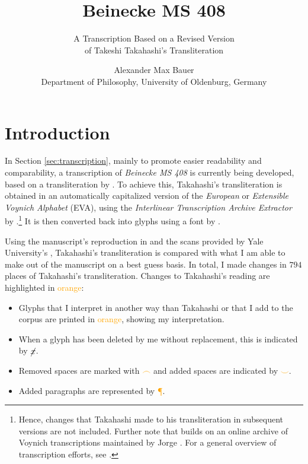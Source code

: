 \documentclass{scrarticle}
\title{Beinecke MS 408}
\subtitle{A Transcription Based on a Revised Version\\of Takeshi Takahashi's Transliteration}
\author{Alexander Max Bauer\\\small{Department of Philosophy, University of Oldenburg, Germany}}
\date{}
\begin{document}
\maketitle
\vfill
\noindent{}
\vfill


\clearpage
\tableofcontents


\clearpage
\section{Introduction}\label{sec:introduction}
In Section \ref{sec:transcription}, mainly to promote easier readability and comparability, a transcription of \textit{Beinecke MS 408} is currently being developed, based on a transliteration by \citet{takahashi_voynich_2004}.
To achieve this, Takahashi's transliteration is obtained in an automatically capitalized version of the \textit{European} or \textit{Extensible Voynich Alphabet} (EVA), using the \textit{Interlinear Transcription Archive Extractor} by \citet{schwerdtfeger_voynich_2004}.\footnote{Hence, changes that Takahashi made to his transliteration in subsequent versions are not included. Further note that \citet{schwerdtfeger_voynich_2004} builds on an online archive of Voynich transcriptions maintained by Jorge \citet{stolfi_voynich_1998}. For a general overview of transcription efforts, see \citet{zandbergen_text_2023}.}
It is then converted back into glyphs using a font by \citet{bettencourt_voynich_2019}.

Using the manuscript's reproduction in \citet{clemens_voynich_2016} and the scans provided by Yale University's \citet{beinecke_voynich_2004}, Takahashi's transliteration is compared with what I am able to make out of the manuscript on a best guess basis.
In total, I made changes in $794$ places of Takahashi's transliteration.
Changes to Takahashi's reading are highlighted in \textcolor{orange}{orange}:

\begin{itemize}
   \item Glyphs that I interpret in another way than Takahashi or that I add to the corpus are printed in \textcolor{orange}{orange}, showing my interpretation.
   \item When a glyph has been deleted by me without replacement, this is indicated by \textcolor{orange}{$\cancel{x}$}.
   \item Removed spaces are marked with \textcolor{orange}{$\frown$} and added spaces are indicated by \textcolor{orange}{$\smile$}.
   \item Added paragraphs are represented by \textcolor{orange}{{\P}}.
\end{itemize}
\end{document}
